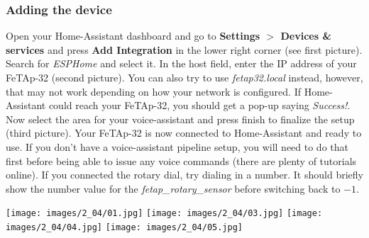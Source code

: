 \documentclass[]{article}
\begin{document}
\subsubsection{Adding the device}
\begin{minipage}[t]{0.4\linewidth}
	\vspace{0pt}
	Open your Home-Assistant dashboard and go to \textbf{Settings $>$ Devices \& services} and press \textbf{Add Integration} in the lower right corner (see first picture).
	\newline
	\newline
	Search for \textit{ESPHome} and select it. In the host field, enter the IP address of your FeTAp-32 (second picture). You can also try to use \textit{fetap32.local} instead, however, that may not work depending on how your network is configured.
	\newline
	\newline
	If Home-Assistant could reach your FeTAp-32, you should get a pop-up saying \textit{Success!}. Now select the area for your voice-assistant and press finish to finalize the setup (third picture).
	\newline
	\newline
	Your FeTAp-32 is now connected to Home-Assistant and ready to use. If you don't have a voice-assistant pipeline setup, you will need to do that first before being able to issue any voice commands (there are plenty of tutorials online). If you connected the rotary dial, try dialing in a number. It should briefly show the number value for the \textit{fetap\_rotary\_sensor} before switching back to $-1$.
\end{minipage}
\hfill
\begin{minipage}[t]{0.5\linewidth}
	\vspace{0pt}
	\texttt{[image: images/2\_04/01.jpg]}
	\texttt{[image: images/2\_04/03.jpg]}
	\texttt{[image: images/2\_04/04.jpg]}
	\texttt{[image: images/2\_04/05.jpg]}
\end{minipage}
\end{document}
